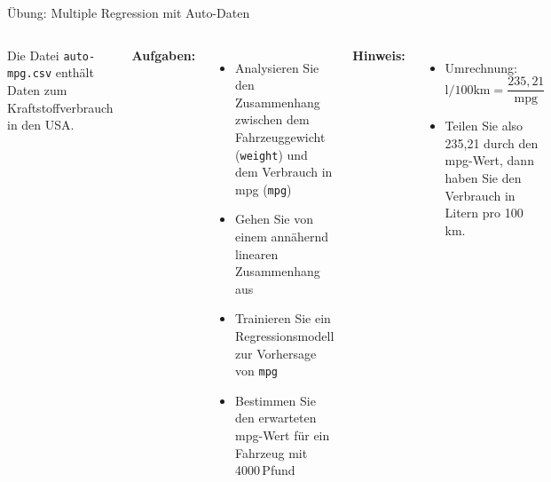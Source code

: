 \begin{frame}{Übung: Multiple Regression mit Auto-Daten}
\begin{columns}

\footnotesize
Die Datei \texttt{auto-mpg.csv} enthält Daten zum Kraftstoffverbrauch in den USA.

\textbf{Aufgaben:}
\begin{itemize}
\item Analysieren Sie den Zusammenhang zwischen dem Fahrzeuggewicht (\texttt{weight})
und dem Verbrauch in mpg (\texttt{mpg})

\item Gehen Sie von einem annähernd linearen Zusammenhang aus

\item Trainieren Sie ein Regressionsmodell zur Vorhersage von \texttt{mpg}

\item Bestimmen Sie den erwarteten mpg-Wert für ein Fahrzeug mit 4000\,Pfund
\end{itemize}

\textbf{Hinweis:}
\begin{itemize}
\item Umrechnung: $\text{l/100km} = \dfrac{235{,}21}{\text{mpg}}$
\item Teilen Sie also 235,21 durch den mpg-Wert, dann haben Sie den Verbrauch in Litern pro 100 km.
\end{itemize}



\end{columns}
\end{frame}

\makequestionspage{\FRAGENIMAGE}

